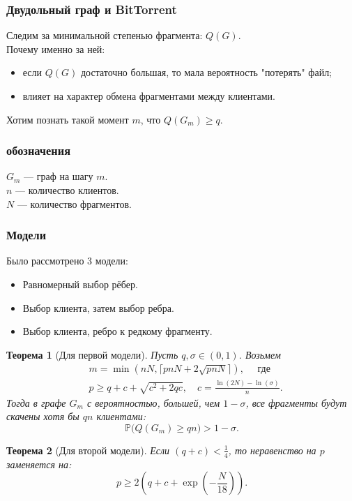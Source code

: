 \documentclass[pdf, intlimits, 12pt, unicode]{beamer} %
\newcommand{\PRob}{\mathbb P}
\newcommand{\geqs}{\geqslant}
\newtheorem*{theoremm}{Теорема}
\begin{document}
\begin{frame}
	\frametitle{Двудольный граф и BitTorrent}
	Следим за минимальной степенью фрагмента: $Q(G)$.\\
	
	Почему именно за ней:
	\begin{itemize}
		\item если $Q(G)$ достаточно большая, то мала вероятность "потерять" файл;
		\item влияет на характер обмена фрагментами между клиентами.
	\end{itemize}
	Хотим познать такой момент $m$, что $Q(G_m) \geqs q$.
\end{frame}


\begin{frame}
	\frametitle{обозначения}
	$G_m$ --- граф на шагу $m$. \\
	$n$ --- количество клиентов. \\
	$N$ --- количество фрагментов. \\
\end{frame}

\begin{frame}
	\frametitle{Модели}
	Было рассмотрено 3 модели:
	\begin{itemize}
		\item Равномерный выбор рёбер.
		\item Выбор клиента, затем выбор ребра.
		\item Выбор клиента, ребро к редкому фрагменту.
	\end{itemize}
\end{frame}



\begin{frame}
\begin{theoremm}[Для первой модели]
Пусть $q, \sigma \in (0, 1)$. Возьмем 
\begin{align*}
& m = \min(nN, \lceil pnN + 2\sqrt{pnN} \rceil), \quad \text{ где} \\
& p \geqs q + c + \sqrt{c^2+2qc}, \quad c = \frac{\ln(2N) - \ln(\sigma)}{n}.
\end{align*}
Тогда в графе $G_m$ с вероятностью, большей, чем $1 - \sigma$, все фрагменты будут скачены хотя бы $qn$ клиентами:
\begin{equation*}
\PRob\big(Q(G_m) \geqs qn\big) > 1 - \sigma.
\end{equation*}
\end{theoremm}

\begin{theoremm}[Для второй модели]
Если $(q+c) < \frac{1}{4}$, то неравенство на $p$ заменяется на:
\begin{equation*}
p \geqs 2\left(q + c + \exp\left(-\frac{N}{18}\right) \right).
\end{equation*}

\end{theoremm}
\end{frame}
\end{document}
